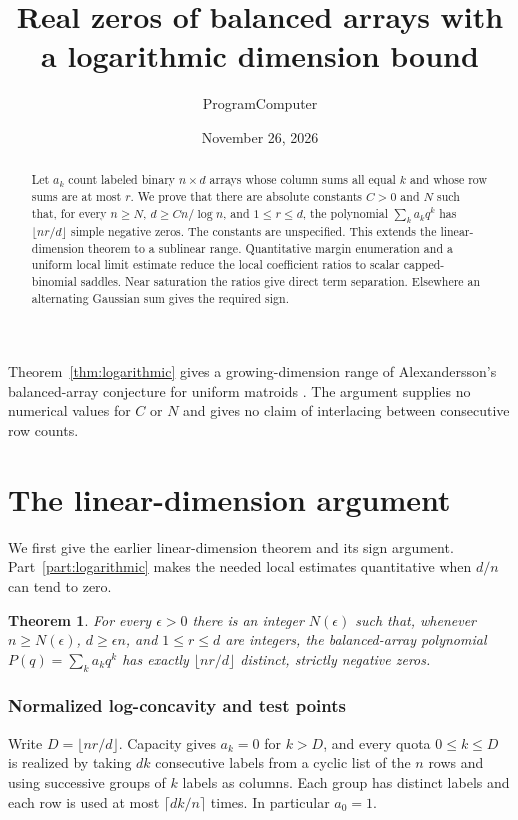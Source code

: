 \documentclass[11pt]{article}
\title{Real zeros of balanced arrays with a logarithmic dimension bound}
\author{ProgramComputer}
\date{November 26, 2026}
\newtheorem{theorem}{Theorem}
\begin{document}
\maketitle

\begin{abstract}
Let $a_k$ count labeled binary $n\times d$ arrays whose column sums
all equal $k$ and whose row sums are at most $r$. We prove that there
are absolute constants $C>0$ and $N$ such that, for every $n\ge N$,
$d\ge Cn/\log n$, and $1\le r\le d$, the polynomial $\sum_k a_k q^k$
has $\lfloor nr/d\rfloor$ simple negative zeros. The constants are
unspecified. This extends the linear-dimension theorem to a sublinear
range. Quantitative margin enumeration and a uniform local limit
estimate reduce the local coefficient ratios to scalar capped-binomial
saddles. Near saturation the ratios give direct term separation.
Elsewhere an alternating Gaussian sum gives the required sign.
\end{abstract}

Theorem~\ref{thm:logarithmic} gives a growing-dimension range of Alexandersson's
balanced-array conjecture for uniform matroids \cite{Alex}. The
argument supplies no numerical values for $C$ or $N$ and gives no
claim of interlacing between consecutive row counts.

\part{The linear-dimension argument}

We first give the earlier linear-dimension theorem and its sign
argument. Part~\ref{part:logarithmic} makes the needed local estimates
quantitative when $d/n$ can tend to zero.

\begin{theorem}\label{thm:main}
For every $\epsilon>0$ there is an integer $N(\epsilon)$ such that,
whenever $n\ge N(\epsilon)$, $d\ge\epsilon n$, and $1\le r\le d$ are
integers, the balanced-array polynomial $P(q)=\sum_k a_kq^k$ has exactly
$\lfloor nr/d\rfloor$ distinct, strictly negative zeros.
\end{theorem}

\section{Normalized log-concavity and test points}

Write $D=\lfloor nr/d\rfloor$. Capacity gives $a_k=0$ for $k>D$, and
every quota $0\le k\le D$ is realized by taking $dk$ consecutive
labels from a cyclic list of the $n$ rows and using successive groups
of $k$ labels as columns. Each group has distinct labels and each row
is used at most $\lceil dk/n\rceil$ times. In particular $a_0=1$.
\end{document}
